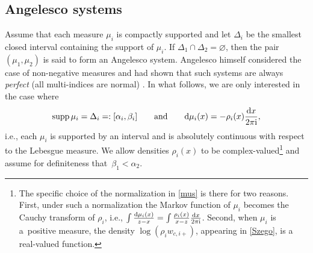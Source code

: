\documentclass[10pt,a4paper]{amsart}
\numberwithin{equation}{section}
\newcommand{\ic}{\mathrm{i}}
\begin{document}
\subsection{Angelesco systems}

Assume that each measure $ \mu_i $ is compactly supported and let $ \Delta_i $ be the smallest closed interval containing the support of $ \mu_i $. If $ \Delta_1\cap \Delta_2 = \varnothing $, then the pair $ (\mu_1,\mu_2) $ is said to form an Angelesco system. Angelesco himself considered the case of non-negative measures and had shown that such systems are always \emph{perfect} (all multi-indices are normal) \cite{Ang19}. In what follows, we are only interested in the case where
\begin{equation}
\label{mus}
\operatorname{supp} \mu_i = \Delta_i =: [\alpha_i,\beta_i] \qquad \text{and}\qquad  {\rm d}\mu_i(x) = -\rho_i(x)\frac{{\rm d}x}{2\pi\ic},
\end{equation}
i.e., each $ \mu_i $ is supported by an interval and is absolutely continuous with respect to the Lebesgue measure. We allow densities $ \rho_i(x) $ to be complex-valued\footnote{The specific choice of the normalization in \eqref{mus} is there for two reasons. First, under such a normalization the Markov function of $ \mu_i $ becomes the Cauchy transform of $ \rho_i $, i.e., $ \int\frac{{\rm d}\mu_i(x)}{z-x}=\int\frac{\rho_i(x)}{x-z}\frac{{\rm d}x}{2\pi\ic} $. Second, when $ \mu_i $ is a~positive measure, the density $ \log(\rho_iw_{c,i+}) $, appearing in \eqref{Szego}, is a real-valued function.} and assume for definiteness that~${ \beta_1<\alpha_2} $.
\end{document}
